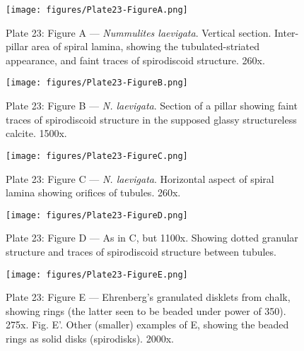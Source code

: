 \documentclass[a4paper, 12pt, oneside]{article}
\begin{document}
\clearpage
{}
\cfoot{\thepage}
\begin{figure}[b]
\centering
\texttt{[image: figures/Plate23-FigureA.png]}
\caption{\small Plate 23: Figure A --- \emph{Nummulites laevigata}. Vertical section. Inter-pillar area of spiral lamina, showing the tubulated-striated appearance, and faint traces of spirodiscoid structure. 260x.}
\end{figure}
\clearpage
\begin{figure}[b]
\centering
\texttt{[image: figures/Plate23-FigureB.png]}
\caption{\small Plate 23: Figure B --- \emph{N. laevigata}. Section of a pillar showing faint traces of spirodiscoid structure in the supposed glassy structureless calcite. 1500x.}
\end{figure}
\clearpage
\begin{figure}[b]
\centering
\texttt{[image: figures/Plate23-FigureC.png]}
\caption{\small Plate 23: Figure C --- \emph{N. laevigata}. Horizontal aspect of spiral lamina showing orifices of tubules. 260x.}
\end{figure}
\clearpage
\begin{figure}[b]
\centering
\texttt{[image: figures/Plate23-FigureD.png]}
\caption{\small Plate 23: Figure D --- As in C, but 1100x. Showing dotted granular structure and traces of spirodiscoid structure between tubules.}
\end{figure}
\clearpage
\begin{figure}[H]
\centering
\texttt{[image: figures/Plate23-FigureE.png]}
\caption{\small Plate 23: Figure E --- Ehrenberg's granulated disklets from chalk, showing rings (the latter seen to be beaded under power of 350). 275x. Fig. E'. Other (smaller) examples of E, showing the beaded rings as solid disks (spirodisks). 2000x.}
\end{figure}
\end{document}
